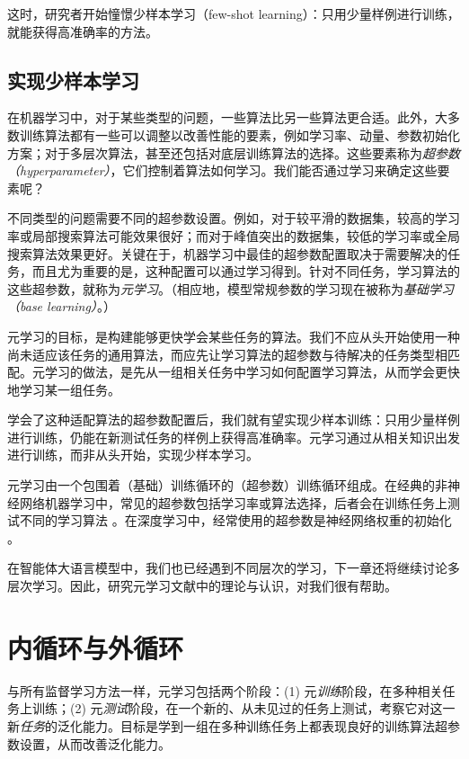 这时，研究者开始憧憬少样本学习（few-shot learning）：只用少量样例进行训练，就能获得高准确率的方法。

\subsection{实现少样本学习}
在机器学习中，对于某些类型的问题，一些算法比另一些算法更合适。此外，大多数训练算法都有一些可以调整以改善性能的要素，例如学习率、动量、参数初始化方案；对于多层次算法，甚至还包括对底层训练算法的选择。这些要素称为{\em 超参数（hyperparameter）}，它们控制着算法如何学习。我们能否通过学习来确定这些要素呢？

不同类型的问题需要不同的超参数设置。例如，对于较平滑的数据集，较高的学习率或局部搜索算法可能效果很好；而对于峰值突出的数据集，较低的学习率或全局搜索算法效果更好。关键在于，机器学习中最佳的超参数配置取决于需要解决的任务，而且尤为重要的是，这种配置可以通过学习得到。针对不同任务，学习算法的这些超参数，就称为{\em 元学习}。（相应地，模型常规参数的学习现在被称为{\em 基础学习（base learning）}。）

元学习的目标，是构建能够更快学会某些任务的算法。我们不应从头开始使用一种尚未适应该任务的通用算法，而应先让学习算法的超参数与待解决的任务类型相匹配。元学习的做法，是先从一组相关任务中学习如何配置学习算法，从而学会更快地学习某一组任务。

学会了这种适配算法的超参数配置后，我们就有望实现少样本训练：只用少量样例进行训练，仍能在新测试任务的样例上获得高准确率。元学习通过从相关知识出发进行训练，而非从头开始，实现少样本学习。

元学习由一个包围着（基础）训练循环的（超参数）训练循环组成。在经典的非神经网络机器学习中，常见的超参数包括学习率或算法选择，后者会在训练任务上测试不同的学习算法 \citep{brazdil2022metalearning}。在深度学习中，经常使用的超参数是神经网络权重的初始化 \citep{finn2017model}。

在智能体大语言模型中，我们也已经遇到不同层次的学习，下一章还将继续讨论多层次学习。因此，研究元学习文献中的理论与认识，对我们很有帮助。

\section{内循环与外循环}

与所有监督学习方法一样，元学习包括两个阶段：(1) 元{\em 训练}阶段，在多种相关任务上训练；(2) 元{\em 测试}阶段，在一个新的、从未见过的任务上测试，考察它对这一新{\em 任务}的泛化能力。目标是学到一组在多种训练任务上都表现良好的训练算法超参数设置，从而改善泛化能力。

